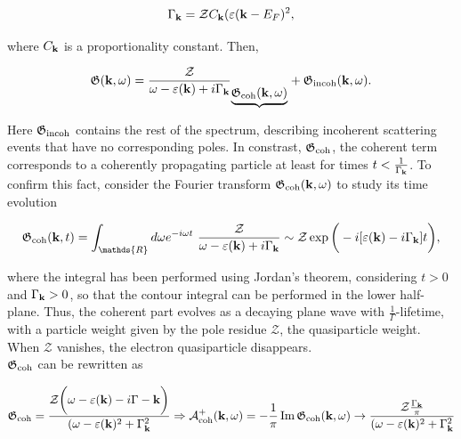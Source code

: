 \documentclass{homework}
\begin{document}
$$
    \Gamma_{{\bf k}} = \mathcal{Z} C_{{\bf k}} (\varepsilon({\bf k} - E_F)^2,
$$

where $C_{{\bf k}}$ is a proportionality constant. Then,

\begin{equation}
\mathfrak{G}({\bf k}, \omega) = {\frac{\mathcal{Z}}{\omega - \varepsilon({\bf k}) + i \Gamma_{{\bf k}}}}_{\underbrace{\mathfrak{G}_{\textnormal{coh}}({\bf k}, \omega)}} + \mathfrak{G}_{\textnormal{incoh}}({\bf k}, \omega).
\end{equation}

Here $\mathfrak{G}_{\textnormal{incoh}}$ contains the rest of the spectrum, describing incoherent scattering events that have no corresponding poles. In constrast, $\mathfrak{G}_{\textnormal{coh}}$, the coherent term corresponds to a coherently propagating particle at least for times $t < \frac{1}{\Gamma_{{\bf k}}}$. To confirm this fact, consider the Fourier transform $\mathfrak{G}_{\textnormal{coh}}({\bf k}, \omega)$ to study its time evolution

\begin{equation}
    {\mathfrak{G}_{\textnormal{coh}}({\bf k}, t)} = \int_{\mathds{R}} d\omega e^{-i\omega t} \blanky {\frac{\mathcal{Z}}{\omega - \varepsilon({\bf k}) + i \Gamma_{{\bf k}}}} \sim \mathcal{Z} \exp \bigg(-i[\varepsilon({\bf k}) - i \Gamma_{\bf k}] t\bigg),
\end{equation}

where the integral has been performed using Jordan's theorem, considering $t > 0$ and $\Gamma_{{\bf k}} > 0$, so that the contour integral can be performed in the lower half-plane. Thus, the coherent part evolves as a decaying plane wave with $\frac{1}{\Gamma}$-lifetime, with a particle weight given by the pole residue $\mathcal{Z}$, the quasiparticle weight. When $\mathcal{Z}$ vanishes, the electron quasiparticle disappears. \\

 $\mathfrak{G}_{\textnormal{coh}}$ can be rewritten as 
 
\begin{equation} \begin{split}
    \mathfrak{G}_{\textnormal{coh}} = \frac{\mathcal{Z}\bigg(\omega - \varepsilon({\bf k}) - i \Gamma-{{\bf k}}\bigg)}{(\omega - \varepsilon({\bf k})^2 + \Gamma_{{\bf k}}^2} \Rightarrow \mathcal{A}^{+}_{\textnormal{coh}}({\bf k}, \omega) = - \frac{1}{\pi} \Im \mathfrak{G}_{\textnormal{coh}}({\bf k}, \omega) \rightarrow \frac{\mathcal{
   Z} \frac{\Gamma_{{\bf k}}}{\pi}}{(\omega - \varepsilon({\bf k})^2 + \Gamma_{{\bf k}}^2}
   \label{Fermi_liquids_valid_approx}
\end{split}
\end{equation}
\end{document}
